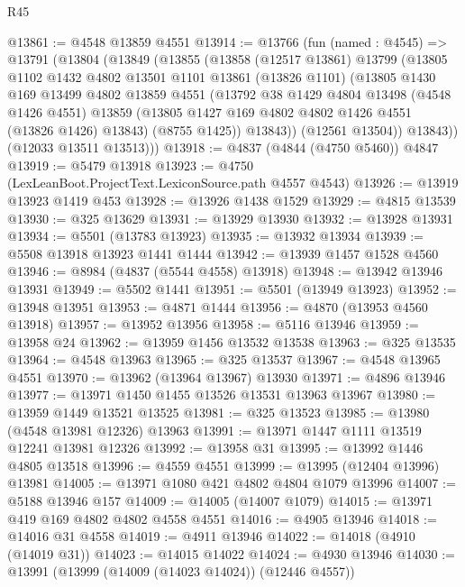 \begin{lexlean}{R45}
\begin{coremodule}
@13861 := @4548 @13859 @4551
@13914 := @13766
    (fun (named : @4545) =>
    @13791
      (@13804
        (@13849
          (@13855
            (@13858
              (@12517 @13861)
              @13799
              (@13805
                @1102
                @1432
                @4802
                @13501
                @1101
                @13861
                (@13826 @1101)
                (@13805
                  @1430
                  @169
                  @13499
                  @4802
                  @13859
                  @4551
                  (@13792
                    @38
                    @1429
                    @4804
                    @13498
                    (@4548 @1426 @4551)
                    @13859
                    (@13805 @1427 @169 @4802 @4802 @1426 @4551 (@13826 @1426) @13843)
                    (@8755 @1425))
                  @13843))
              (@12561 @13504))
            @13843))
        (@12033 @13511 @13513)))
@13918 := @4837 (@4844 (@4750 @5460)) @4847
@13919 := @5479 @13918
@13923 := @4750 (LexLeanBoot.ProjectText.LexiconSource.path @4557 @4543)
@13926 := @13919 @13923 @1419 @453
@13928 := @13926 @1438 @1529
@13929 := @4815 @13539
@13930 := @325 @13629
@13931 := @13929 @13930
@13932 := @13928 @13931
@13934 := @5501 (@13783 @13923)
@13935 := @13932 @13934
@13939 := @5508 @13918 @13923 @1441 @1444
@13942 := @13939 @1457 @1528 @4560
@13946 := @8984 (@4837 (@5544 @4558) @13918)
@13948 := @13942 @13946 @13931
@13949 := @5502 @1441
@13951 := @5501 (@13949 @13923)
@13952 := @13948 @13951
@13953 := @4871 @1444
@13956 := @4870 (@13953 @4560 @13918)
@13957 := @13952 @13956
@13958 := @5116 @13946
@13959 := @13958 @24
@13962 := @13959 @1456 @13532 @13538
@13963 := @325 @13535
@13964 := @4548 @13963
@13965 := @325 @13537
@13967 := @4548 @13965 @4551
@13970 := @13962 (@13964 @13967) @13930
@13971 := @4896 @13946
@13977 := @13971 @1450 @1455 @13526 @13531 @13963 @13967
@13980 := @13959 @1449 @13521 @13525
@13981 := @325 @13523
@13985 := @13980 (@4548 @13981 @12326) @13963
@13991 := @13971 @1447 @1111 @13519 @12241 @13981 @12326
@13992 := @13958 @31
@13995 := @13992 @1446 @4805 @13518
@13996 := @4559 @4551
@13999 := @13995 (@12404 @13996) @13981
@14005 := @13971 @1080 @421 @4802 @4804 @1079 @13996
@14007 := @5188 @13946 @157
@14009 := @14005 (@14007 @1079)
@14015 := @13971 @419 @169 @4802 @4802 @4558 @4551
@14016 := @4905 @13946
@14018 := @14016 @31 @4558
@14019 := @4911 @13946
@14022 := @14018 (@4910 (@14019 @31))
@14023 := @14015 @14022
@14024 := @4930 @13946
@14030 := @13991 (@13999 (@14009 (@14023 @14024)) (@12446 @4557))

\end{coremodule}
\end{lexlean}
